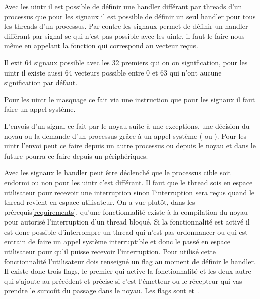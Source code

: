 Avec les uintr il est possible de définir une handler différant par threads d'un processus que pour les signaux il est possible de définir un seul handler pour tous les threads d'un processus.
Par-contre les signaux permet de définir un handler différant par signal se qui n'est pas possible avec les uintr, il faut le faire nous même en appelant la fonction qui correspond au vecteur reçus. %

Il exit 64 signaux possible avec les 32 premiers qui on on signification, pour les uintr il existe aussi 64 vecteurs possible entre 0 et 63 qui n'ont aucune signification par défaut.

Pour les uintr le masquage ce fait via une instruction que pour les signaux il faut faire un appel système.

L'envois d'un signal ce fait par le noyau suite à une exceptions, une décision du noyau ou la demande d'un processus grâce à un appel système ( ou ).
Pour les uintr l'envoi peut ce faire depuis un autre processus ou depuis le noyau et dans le future pourra ce faire depuis un périphériques.

Avec les signaux le handler peut être déclenché que le processus cible soit endormi ou non pour les uintr c'est différant.
Il faut que le thread sois en espace utilisateur pour recevoir une interruption sinon l'interruption sera reçus quand le thread revient en espace utilisateur.
On a vue plutôt, dans les prérequis\ref{requirements}, qu'une fonctionnalité existe à la compilation du noyau pour autorisé l'interruption d'un thread bloqué.
Si la fonctionnalité est activé il est donc possible d'interrompre un thread qui n'est pas ordonnancer ou qui est entrain de faire un appel système interruptible et donc le passé en espace utilisateur pour qu'il puisse recevoir l'interruption. %
Pour utilisé cette fonctionnalité l'utilisateur dois renseigné un flag au moment de définir le handler.
Il existe donc trois flags, le premier  qui active la fonctionnalité et les deux autre qui s'ajoute au précédent et précise si c'est l'émetteur ou le récepteur qui vas prendre le surcoût du passage dans le noyau.
Les flags sont  et .

